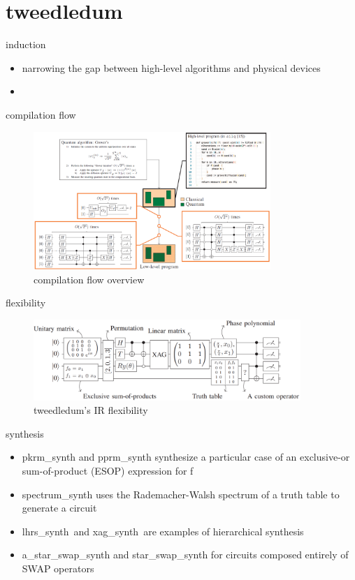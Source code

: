 \section{tweedledum}
\begin{frame}{induction}  
  \begin{itemize}
    \item  narrowing the gap between high-level algorithms and physical devices
    \item 
  \end{itemize}
\end{frame}
\begin{frame}{compilation flow}
  \begin{figure}[htbq]
    \centering
    \includegraphics[width=0.8\textwidth]{figure/work_flow.png}
    \caption{compilation flow overview} 
    \label{fig-compilation}
  \end{figure}
\end{frame}
\begin{frame}{flexibility}
  \begin{figure}[htbq]
    \centering
    \includegraphics[width=0.9\textwidth]{figure/flex.png}
    \caption{tweedledum's IR flexibility} 
    \label{fig-flex}
  \end{figure}
\end{frame}
\begin{frame}{synthesis}
  \begin{itemize}
    \item pkrm\_synth and pprm\_synth synthesize a particular case of an exclusive-or sum-of-product (ESOP) expression for f
    \item spectrum\_synth uses the Rademacher-Walsh spectrum of a truth table to generate a circuit
    \item lhrs\_synth\ and xag\_synth\ are examples of hierarchical synthesis
    \item a\_star\_swap\_synth and star\_swap\_synth for circuits composed entirely of SWAP operators
  \end{itemize}  
\end{frame}
